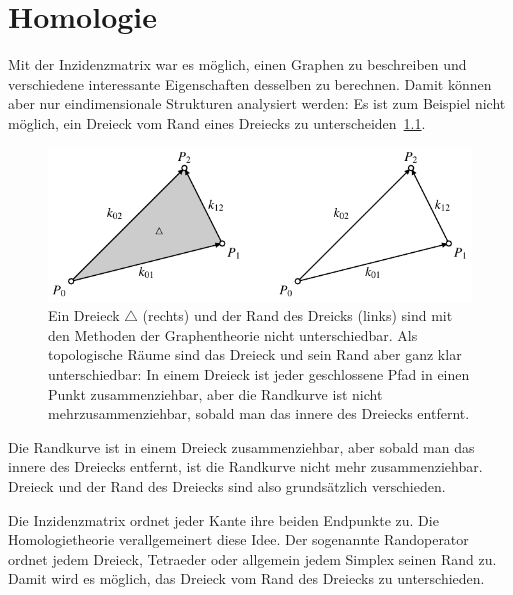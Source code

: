 %
%
%
\chapter{Homologie
\label{buch:chapter:homologie}}
\rhead{}
Mit der Inzidenzmatrix war es möglich, einen Graphen zu beschreiben
und verschiedene interessante Eigenschaften desselben zu berechnen.
Damit können aber nur eindimensionale Strukturen analysiert werden:
Es ist zum Beispiel nicht möglich, ein Dreieck vom Rand eines
Dreiecks zu unterscheiden~\ref{buch:homologie:figure:zusammenziehbar}.
\begin{figure}
\centering
\includegraphics{chapters/95-homologie/images/dreieck.pdf}
\caption{Ein Dreieck $\triangle$ (rechts) und der Rand des Dreicks
(links) sind mit den Methoden
der Graphentheorie nicht unterschiedbar. 
Als topologische Räume sind das Dreieck und sein Rand aber ganz klar
unterschiedbar: In einem Dreieck ist jeder geschlossene Pfad in einen 
Punkt zusammenziehbar, aber die Randkurve ist nicht mehrzusammenziehbar,
sobald man das innere des Dreiecks entfernt.
\label{buch:homologie:figure:zusammenziehbar}}
\end{figure}
Die Randkurve ist in einem Dreieck zusammenziehbar, aber sobald man
das innere des Dreiecks entfernt, ist die Randkurve nicht mehr
zusammenziehbar.
Dreieck und der Rand des Dreiecks sind also grundsätzlich verschieden.

Die Inzidenzmatrix ordnet jeder Kante ihre beiden Endpunkte zu.
Die Homologietheorie verallgemeinert diese Idee.
Der sogenannte Randoperator ordnet jedem Dreieck, Tetraeder oder allgemein
jedem Simplex seinen Rand zu.
Damit wird es möglich, das Dreieck vom Rand des Dreiecks zu unterschieden.




%








